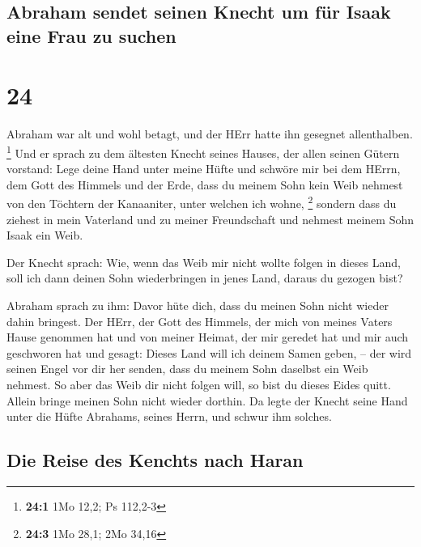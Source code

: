 \hypertarget{abraham-sendet-seinen-knecht-um-fuxfcr-isaak-eine-frau-zu-suchen}{%
\subsection{Abraham sendet seinen Knecht um für Isaak eine Frau zu
suchen}\label{abraham-sendet-seinen-knecht-um-fuxfcr-isaak-eine-frau-zu-suchen}}

\hypertarget{section-23}{%
\section{24}\label{section-23}}

 Abraham war alt und wohl betagt, und der HErr hatte ihn
gesegnet allenthalben. \footnote{\textbf{24:1} 1Mo 12,2; Ps 112,2-3}
 Und er sprach zu dem ältesten Knecht seines Hauses, der
allen seinen Gütern vorstand: Lege deine Hand unter meine Hüfte
 und schwöre mir bei dem HErrn, dem Gott des Himmels und
der Erde, dass du meinem Sohn kein Weib nehmest von den Töchtern der
Kanaaniter, unter welchen ich wohne, \footnote{\textbf{24:3} 1Mo 28,1;
  2Mo 34,16}  sondern dass du ziehest in mein Vaterland
und zu meiner Freundschaft und nehmest meinem Sohn Isaak ein Weib.

 Der Knecht sprach: Wie, wenn das Weib mir nicht wollte
folgen in dieses Land, soll ich dann deinen Sohn wiederbringen in jenes
Land, daraus du gezogen bist?

 Abraham sprach zu ihm: Davor hüte dich, dass du meinen
Sohn nicht wieder dahin bringest.  Der HErr, der Gott des
Himmels, der mich von meines Vaters Hause genommen hat und von meiner
Heimat, der mir geredet hat und mir auch geschworen hat und gesagt:
Dieses Land will ich deinem Samen geben, -- der wird seinen Engel vor
dir her senden, dass du meinem Sohn daselbst ein Weib nehmest.
 So aber das Weib dir nicht folgen will, so bist du dieses
Eides quitt. Allein bringe meinen Sohn nicht wieder dorthin.
 Da legte der Knecht seine Hand unter die Hüfte Abrahams,
seines Herrn, und schwur ihm solches.

\hypertarget{die-reise-des-kenchts-nach-haran}{%
\subsection{Die Reise des Kenchts nach
Haran}\label{die-reise-des-kenchts-nach-haran}}

